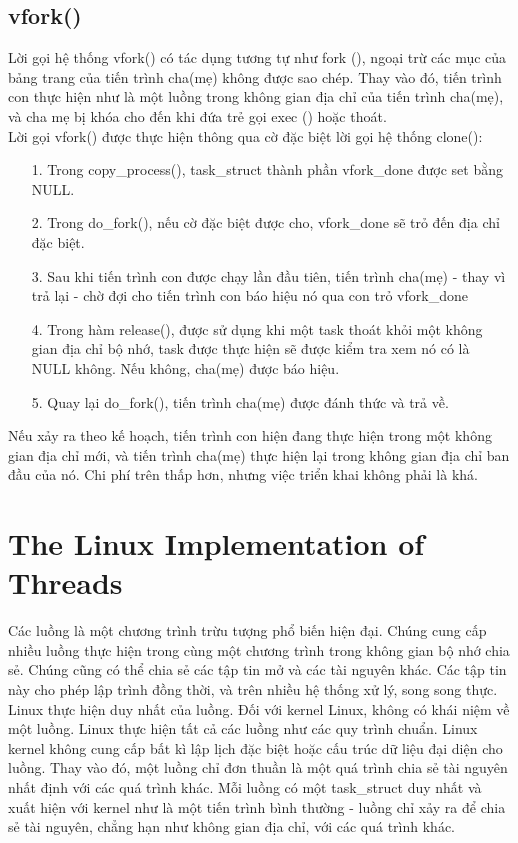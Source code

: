 \documentclass[a4paper,10pt]{report}
\begin{document}
\subsection{vfork()}
Lời gọi hệ thống vfork() có tác dụng tương tự như fork (), ngoại trừ các mục của bảng trang của tiến trình cha(mẹ) không được sao chép. Thay vào đó, tiến trình con thực hiện như là một luồng trong không gian địa chỉ của tiến trình cha(mẹ), và cha mẹ bị khóa cho đến khi đứa trẻ gọi exec () hoặc thoát. \\

Lời gọi vfork() được thực hiện thông qua cờ đặc biệt lời gọi hệ thống clone():
\begin{itemize}
\item[1. ] Trong copy\_process(), task\_struct thành phần vfork\_done  được set bằng NULL.
\item[2. ] Trong do\_fork(), nếu cờ đặc biệt được cho, vfork\_done sẽ trỏ đến địa chỉ đặc biệt.
\item[3. ] Sau khi tiến trình con được chạy lần đầu tiên, tiến trình cha(mẹ) - thay vì trả lại - chờ đợi cho tiến trình con báo hiệu nó qua con trỏ vfork\_done
\item[4. ] Trong hàm release(), được sử dụng khi một task thoát khỏi một không gian địa chỉ bộ nhớ, task được thực hiện sẽ được kiểm tra xem nó có là NULL không. Nếu không, cha(mẹ) được báo hiệu.
\item[5. ] Quay lại do\_fork(), tiến trình cha(mẹ) được đánh thức và trả về.
\end{itemize} 
Nếu xảy ra theo kế hoạch, tiến trình con hiện đang thực hiện trong một không gian địa chỉ mới, và tiến trình cha(mẹ) thực hiện lại trong không gian địa chỉ ban đầu của nó. Chi phí trên thấp hơn, nhưng việc triển khai không phải là khá.
\section{The Linux Implementation of Threads}
Các luồng là một chương trình trừu tượng phổ biến hiện đại. Chúng cung cấp nhiều luồng thực hiện trong cùng một chương trình trong không gian bộ nhớ chia sẻ. Chúng cũng có thể chia sẻ các tập tin mở và các tài nguyên khác. Các tập tin này cho phép lập trình đồng thời, và trên nhiều hệ thống xử lý, song song thực. \\

Linux thực hiện duy nhất của luồng. Đối với kernel Linux, không có khái niệm về một luồng. Linux thực hiện tất cả các luồng như các quy trình chuẩn. Linux kernel không cung cấp bất kì lập lịch đặc biệt hoặc cấu trúc dữ liệu đại diện cho luồng. Thay vào đó, một luồng chỉ đơn thuần là một quá trình chia sẻ tài nguyên nhất định với các quá trình khác. Mỗi luồng có một task\_struct duy nhất và xuất hiện với kernel như là một tiến trình bình thường - luồng chỉ xảy ra để chia sẻ tài nguyên, chẳng hạn như không gian địa chỉ, với các quá trình khác. \\
\end{document}
